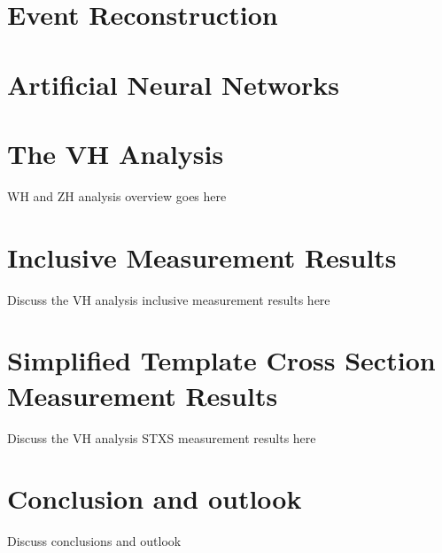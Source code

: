 \documentclass{umassthesis}          %
\begin{document}
\chapter{Event Reconstruction}\label{ch:reco}

\chapter{Artificial Neural Networks}\label{ch:nn}

\chapter{The VH Analysis}\label{ch:vh_analysis}
WH and ZH analysis overview goes here

\chapter{Inclusive Measurement Results}\label{ch:vh_inclusive_results}
Discuss the VH analysis inclusive measurement results here

\chapter{Simplified Template Cross Section Measurement Results}\label{ch:vh_stxs_results}
Discuss the VH analysis STXS measurement results here

\chapter{Conclusion and outlook}\label{ch:conclusions}
Discuss conclusions and outlook



\end{document}
